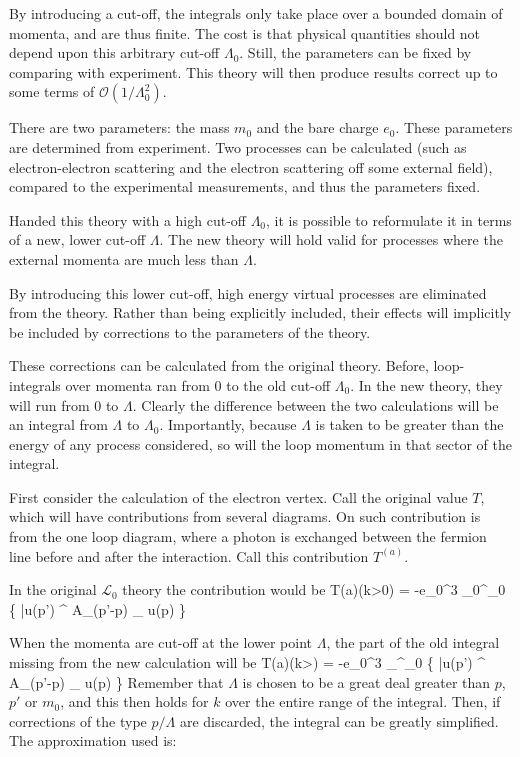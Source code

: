 By introducing a cut-off, the integrals only take place over a bounded domain of momenta, and are thus finite.  The cost is that physical quantities should not depend upon this arbitrary cut-off $\Lambda_0$.  Still, the parameters can be fixed by comparing with experiment.  This theory will then produce results correct up to some terms of $\mathcal{O}(1/\Lambda_0^2)$.

There are two parameters: the mass $m_0$ and the bare charge $e_0$.  These parameters are determined from experiment.  Two processes can be calculated (such as electron-electron scattering and the electron scattering off some external field), compared to the experimental measurements, and thus the parameters fixed.

Handed this theory with a high cut-off $\Lambda_0$, it is possible to reformulate it in terms of a new, lower cut-off $\Lambda$.  The new theory will hold valid for processes where the external momenta are much less than $\Lambda$.	

By introducing this lower cut-off, high energy virtual processes are eliminated from the theory.  Rather than being explicitly included, their effects will implicitly be included by corrections to the parameters of the theory.

These corrections can be calculated from the original theory.  Before, loop-integrals over momenta ran from $0$ to the old cut-off $\Lambda_0$.  In the new theory, they will run from $0$ to $\Lambda$.  Clearly the difference between the two calculations will be an integral from $\Lambda$ to $\Lambda_0$.  Importantly, because $\Lambda$ is taken to be greater than the energy of any process considered, so will the loop momentum in that sector of the integral.

First consider the calculation of the electron vertex.  Call the original value $T$, which will have contributions from several diagrams.  On such contribution is from the one loop diagram, where a photon is exchanged between the fermion line before and after the interaction.  Call this contribution $T^{(a)}$.  

In the original $\mathcal{L}_0$ theory the contribution would be
\small
\beq
	T{(a)}(k>0) = -e_0^3 \int_{0}^{\Lambda_0}   \left\{
		\bar{u}(p') \gamma^\mu {} A_{}(p'-p) \cdot \gamma {} \gamma_\mu
		u(p) \right\}
\eeq  
\normalsize

When the momenta are cut-off at the lower point $\Lambda$, the part of the old integral missing from the new calculation will be
\small
\beq
	T{(a)}(k>\Lambda) = -e_0^3 \int_{\Lambda}^{\Lambda_0}   \left\{
		\bar{u}(p') \gamma^\mu {} A_{}(p'-p) \cdot \gamma {} \gamma_\mu
		u(p) \right\}
\eeq 
\normalsize
Remember that $\Lambda$ is chosen to be a great deal greater than $p$, $p'$ or $m_0$, and this then holds for $k$ over the entire range of the integral.  Then, if corrections of the type $p/\Lambda$ are discarded, the integral can be greatly simplified.  The approximation used is:

